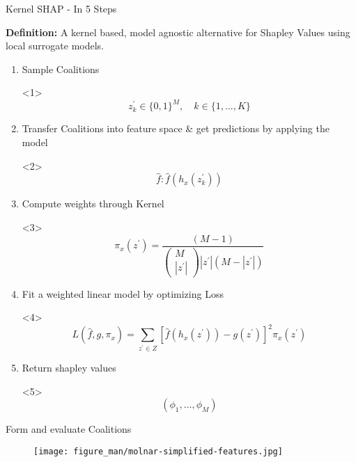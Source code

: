 \documentclass[10pt,compress,t,notes=noshow, xcolor=table]{beamer}
\begin{document}
\begin{vbframe}{Kernel SHAP - In 5 Steps}

\textbf{Definition:} A kernel based, model agnostic alternative for Shapley Values using local surrogate models.\\
\vspace{1cm}
\begin{enumerate}
    \item Sample Coalitions 
    \begin{onlyenv}<1>
    $$z_{k}^{\prime} \in\{0,1\}^{M}, \quad k \in\{1, \ldots, K\}$$
    \end{onlyenv}
    
    \item Transfer Coalitions into feature space \& get predictions by applying the model
    
    \begin{onlyenv}<2>
    $$\hat{f}: \hat{f}\left(h_{x}\left(z_{k}^{\prime}\right)\right)$$
    \end{onlyenv}
    
    \item Compute weights through Kernel
    \begin{onlyenv}<3>
    $$\pi_{x}\left(z^{\prime}\right)=\frac{(M-1)}{\left(\begin{array}{c} M \\\left|z^{\prime}\right|\end{array}\right)\left|z^{\prime}\right|\left(M-\left|z^{\prime}\right|\right)}$$
    \end{onlyenv}
    
    \item Fit a weighted linear model by optimizing Loss
    \begin{onlyenv}<4>
    $$L\left(\hat{f}, g, \pi_{x}\right)=\sum_{z^{\prime} \in Z}\left[\hat{f}\left(h_{x}\left(z^{\prime}\right)\right)-g\left(z^{\prime}\right)\right]^{2} \pi_{x}\left(z^{\prime}\right)$$
    \end{onlyenv}

    \item Return shapley values
    \begin{onlyenv}<5>
    $$(\phi_1, \ldots, \phi_M)$$
    \end{onlyenv}
    
    
\end{enumerate}

\end{vbframe}

\begin{vbframe}{Form and evaluate Coalitions}

\begin{figure}
    \centering
    \texttt{[image: figure\_man/molnar-simplified-features.jpg]}
\end{figure}

 \end{vbframe}
 
\end{document}
